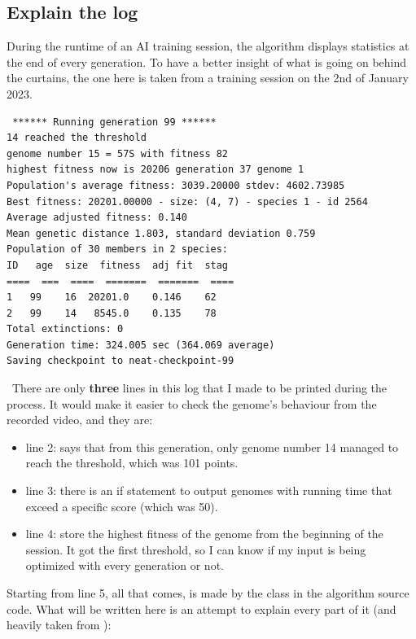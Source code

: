 \subsection{Explain the log}\label{sec:explain-the-log}

During the runtime of an AI training session, the algorithm displays statistics at the end of every generation. To have a better insight of what is going on behind the curtains, the one here is taken from a training session on the 2nd of January 2023.

\begin{listing}[H]
\begin{verbatim}
 ****** Running generation 99 ****** 
14 reached the threshold
genome number 15 = 57S with fitness 82
highest fitness now is 20206 generation 37 genome 1
Population's average fitness: 3039.20000 stdev: 4602.73985
Best fitness: 20201.00000 - size: (4, 7) - species 1 - id 2564
Average adjusted fitness: 0.140
Mean genetic distance 1.803, standard deviation 0.759
Population of 30 members in 2 species:
ID   age  size  fitness  adj fit  stag
====  ===  ====  =======  =======  ====
1   99    16  20201.0    0.146    62
2   99    14   8545.0    0.135    78
Total extinctions: 0
Generation time: 324.005 sec (364.069 average)
Saving checkpoint to neat-checkpoint-99
\end{verbatim}
\end{listing}
 There are only \textbf{three} lines in this log that I made to be printed during the process. It would make it easier to check the genome's behaviour from the recorded video, and they are:
 \begin{itemize}
\item line 2: says that from this generation, only genome number 14 managed to reach the threshold, which was 101 points.
\item line 3: there is an if statement to output genomes with running time that exceed a specific score (which was 50).
\item line 4: store the highest fitness of the genome from the beginning of the session. It got the first threshold, so I can know if my input is being optimized with every generation or not.
 \end{itemize}

Starting from line 5, all that comes, is made by the  class in the algorithm source code. What will be written here is an attempt to explain every part of it (and heavily taken from ):


